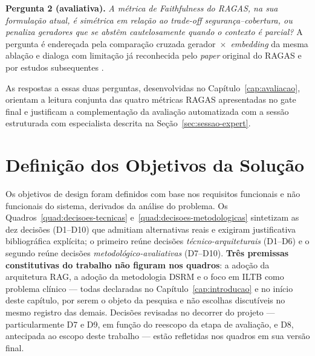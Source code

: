 \documentclass[
  12pt,
  oneside,
  a4paper,
  english,
  brazil
]{abntex2}
\begin{document}
\textbf{Pergunta 2 (avaliativa).} \emph{A métrica de
\emph{Faithfulness} do RAGAS, na sua formulação atual, é simétrica em
relação ao \emph{trade-off} segurança--cobertura, ou penaliza
geradores que se abstêm cautelosamente quando o contexto é parcial?}
A pergunta é endereçada pela comparação cruzada
gerador~$\times$~\emph{embedding} da mesma ablação e dialoga com
limitação já reconhecida pelo \emph{paper} original do RAGAS
\cite{es2024} e por estudos subsequentes
\cite{huang2023halucination, zakka2024almanac, ocaf2024}.

As respostas a essas duas perguntas, desenvolvidas no
Capítulo~\ref{cap:avaliacao}, orientam a leitura conjunta das quatro
métricas RAGAS apresentadas no gate final e justificam a complementação
da avaliação automatizada com a sessão estruturada com especialista
descrita na Seção~\ref{sec:sessao-expert}.

\section{Definição dos Objetivos da Solução}

Os objetivos de design foram definidos com base nos requisitos funcionais e
não funcionais do sistema, derivados da análise do problema. Os
Quadros~\ref{quad:decisoes-tecnicas} e~\ref{quad:decisoes-metodologicas}
sintetizam as dez decisões (D1--D10) que admitiam alternativas reais e
exigiram justificativa bibliográfica explícita; o primeiro reúne decisões
\emph{técnico-arquiteturais} (D1--D6) e o segundo reúne decisões
\emph{metodológico-avaliativas} (D7--D10). \textbf{Três premissas
constitutivas do trabalho não figuram nos quadros}: a adoção da arquitetura
RAG, a adoção da metodologia DSRM e o foco em ILTB como problema clínico
--- todas declaradas no Capítulo~\ref{cap:introducao} e no início deste
capítulo, por serem o objeto da pesquisa e não escolhas discutíveis no
mesmo registro das demais. Decisões revisadas no decorrer do projeto ---
particularmente D7 e D9, em função do reescopo da etapa de avaliação, e D8,
antecipada ao escopo deste trabalho --- estão refletidas nos quadros em sua
versão final.
\end{document}
